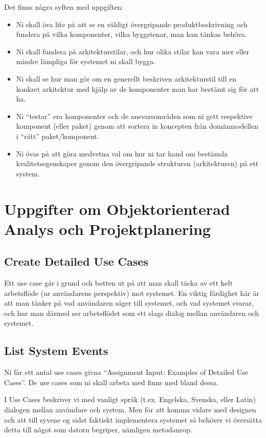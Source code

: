 \documentclass[8pt,oneside]{memoir}
\begin{document}
Det finns några syften med uppgiften:
\begin{itemize}
\item Ni skall öva lite på att se en väldigt övergripande produktbeskrivning och fundera på vilka komponenter, vilka byggstenar, man kan tänkas behöva.
\item Ni skall fundera på arkitekturstilar, och hur olika stilar kan vara mer eller mindre lämpliga för systemet ni skall bygga.
\item Ni skall se hur man gör om en generellt beskriven arkitekturstil till en konkret arkitektur med hjälp av de komponenter man har bestämt sig för att ha.
\item Ni ``testar'' era komponenter och de ansvarsområden som ni gett respektive komponent (eller paket) genom att sortera in koncepten från domänmodellen i ``rätt'' paket/komponent.
\item Ni övas på att göra medvetna val om hur ni tar hand om bestämda kvalitetsegenskaper genom den övergripande strukturen (arkitekturen) på ett system.
\end{itemize}
\part{Uppgifter om Objektorienterad Analys och Projektplanering}
\label{sec:org2bd8149}
\chapter{Create Detailed Use Cases}
\label{sec:orgc28a4af}
Ett use case går i grund och botten ut på att man skall täcka av ett helt arbetsflöde (ur användarens perspektiv) mot systemet. En viktig färdighet här är att man tänker på vad användaren säger till systemet, och vad systemet svarar, och hur man därmed ser arbetsflödet som ett slags dialog mellan användaren och systemet.
\chapter{List System Events}
\label{sec:orgcb56f56}
Ni får ett antal use cases givna ``Assignment Input: Examples of Detailed Use Cases''. De use cases som ni skall arbeta med finns med bland dessa.

I Use Cases beskriver vi med vanligt språk (t.ex. Engelska, Svenska, eller Latin) dialogen mellan användare och system. Men för att komma vidare med designen och att till syvene og sidst faktiskt implementera systemet så behöver vi översätta detta till något som datorn begriper, nämligen metodanrop.
\end{document}
